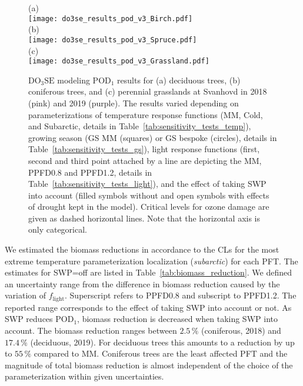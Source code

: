 \documentclass[bg, manuscript]{copernicus}
\begin{document}
\begin{figure}[t]
  \centering
  (a)\\
  \texttt{[image: do3se\_results\_pod\_v3\_Birch.pdf]}\\
  (b)\\
  \texttt{[image: do3se\_results\_pod\_v3\_Spruce.pdf]}\\
  (c)\\
  \texttt{[image: do3se\_results\_pod\_v3\_Grassland.pdf]}
  \caption{$\mathrm{DO_3SE}$ modeling $\mathrm{POD_1}$ results for (a) deciduous trees, (b) coniferous trees, and (c) perennial grasslands at Svanhovd in 2018 (pink) and 2019 (purple). The results varied depending on parameterizations of temperature response functions (MM, Cold, and Subarctic, details in Table~\ref{tab:sensitivity_tests_temp}), growing season (GS MM (squares) or GS bespoke (circles), details in Table~\ref{tab:sensitivity_tests_gs}), light response functions (first, second and third point attached by a line are depicting the MM, PPFD0.8 and PPFD1.2, details in Table~\ref{tab:sensitivity_tests_light}), and the effect of taking SWP into account (filled symbols without and open symbols with effects of drought kept in the model). Critical levels for ozone damage \citep{ICP:MappingManual2017,ESPR:Hayes2021} are given as dashed horizontal lines. Note that the horizontal axis is only categorical.}
  \label{fig:pody_rel}
\end{figure}

We estimated the biomass reductions in accordance to the CLs \citep{ICP:MappingManual2017, ESPR:Hayes2021} for the most extreme temperature parameterization localization (\emph{subarctic}) for each PFT. The estimates for SWP=off are listed in Table~\ref{tab:biomass_reduction}. We defined an uncertainty range from the difference in biomass reduction caused by the variation of $f_\mathrm{light}$. Superscript refers to PPFD0.8 and subscript to PPFD1.2. The reported range corresponds to the effect of taking SWP into account or not. As SWP reduces $\mathrm{POD_1}$, biomass reduction is decreased when taking SWP into account. The biomass reduction ranges between $2.5\,\unit{\%}$ (coniferous, 2018) and $17.4\,\unit{\%}$ (deciduous, 2019). For deciduous trees this amounts to a reduction by up to $55\,\unit{\%}$ compared to MM.
Coniferous trees are the least affected PFT and the magnitude of total biomass reduction is almost independent of the choice of the parameterization within given uncertainties.
\end{document}
